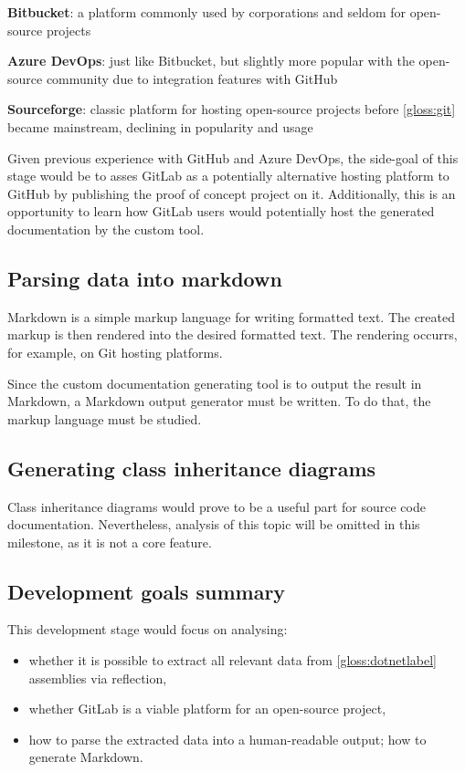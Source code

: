 \textbf{Bitbucket}: a platform commonly used by corporations and seldom for open-source projects

\textbf{Azure DevOps}: just like Bitbucket, but slightly more popular with the open-source community due to integration features with GitHub

\textbf{Sourceforge}: classic platform for hosting open-source projects before \ref{gloss:git} became mainstream, declining in popularity and usage

Given previous experience with GitHub and Azure DevOps, the side-goal of this stage would be to asses GitLab as a potentially alternative hosting platform to GitHub by publishing the proof of concept project on it. Additionally, this is an opportunity to learn how GitLab users would potentially host the generated documentation by the custom tool.

\subsection{Parsing data into markdown}
Markdown is a simple markup language for writing formatted text. The created markup is then rendered into the desired formatted text. The rendering occurrs, for example, on Git hosting platforms.

Since the custom documentation generating tool is to output the result in Markdown, a Markdown output generator must be written. To do that, the markup language must be studied.

\subsection{Generating class inheritance diagrams}
Class inheritance diagrams would prove to be a useful part for source code documentation. Nevertheless, analysis of this topic will be omitted in this milestone, as it is not a core feature.

\subsection{Development goals summary}
This development stage would focus on analysing:
\begin{itemize}
    \item whether it is possible to extract all relevant data from \ref{gloss:dotnetlabel} assemblies via reflection,
    \item whether GitLab is a viable platform for an open-source project,
    \item how to parse the extracted data into a human-readable output; how to generate Markdown.
\end{itemize}

